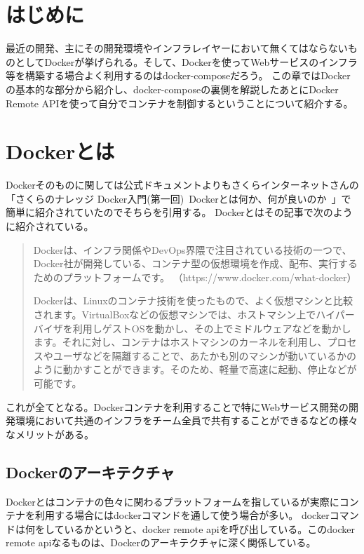 \section{はじめに}

最近の開発、主にその開発環境やインフラレイヤーにおいて無くてはならないものとしてDockerが挙げられる。そして、Dockerを使ってWebサービスのインフラ等を構築する場合よく利用するのはdocker-composeだろう。
この章ではDockerの基本的な部分から紹介し、docker-composeの裏側を解説したあとにDocker Remote APIを使って自分でコンテナを制御するということについて紹介する。


\section{Dockerとは}

Dockerそのものに関しては公式ドキュメントよりもさくらインターネットさんの「さくらのナレッジ Docker入門(第一回)~Dockerとは何か、何が良いのか~」で簡単に紹介されていたのでそちらを引用する。
Dockerとはその記事で次のように紹介されている。\cite{sakura}

\begin{quote}
Dockerは、インフラ関係やDevOps界隈で注目されている技術の一つで、Docker社が開発している、コンテナ型の仮想環境を作成、配布、実行するためのプラットフォームです。
（https://www.docker.com/what-docker）

Dockerは、Linuxのコンテナ技術を使ったもので、よく仮想マシンと比較されます。VirtualBoxなどの仮想マシンでは、ホストマシン上でハイパーバイザを利用しゲストOSを動かし、その上でミドルウェアなどを動かします。それに対し、コンテナはホストマシンのカーネルを利用し、プロセスやユーザなどを隔離することで、あたかも別のマシンが動いているかのように動かすことができます。そのため、軽量で高速に起動、停止などが可能です。
\end{quote}

これが全てとなる。Dockerコンテナを利用することで特にWebサービス開発の開発環境において共通のインフラをチーム全員で共有することができるなどの様々なメリットがある。


\subsection{Dockerのアーキテクチャ}
Dockerとはコンテナの色々に関わるプラットフォームを指しているが実際にコンテナを利用する場合にはdockerコマンドを通して使う場合が多い。
dockerコマンドは何をしているかというと、docker remote apiを呼び出している。このdocker remote apiなるものは、Dockerのアーキテクチャに深く関係している。


